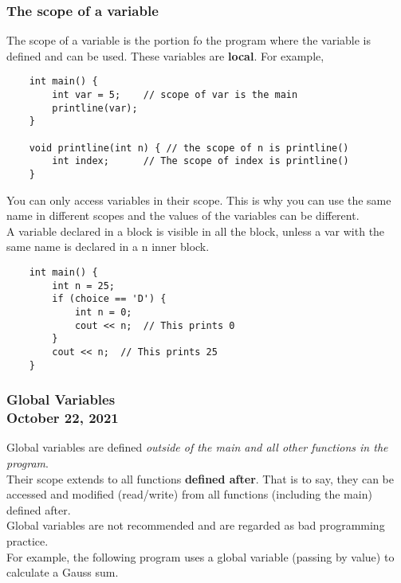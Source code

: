 \documentclass[]{article}
\begin{document}
\subsubsection{The scope of a variable}
\bigbreak


The scope of a variable is the portion fo the program where the variable is defined and can be used. These variables are \textbf{local}. For example, 

\begin{lstlisting}
	int main() {
		int var = 5;	// scope of var is the main	
		printline(var);
	}
	
	void printline(int n) {	// the scope of n is printline()
		int index;		// The scope of index is printline()	
	}
\end{lstlisting}\bigbreak

You can only access variables in their scope. This is why you can use the same name in different scopes and the values of the variables can be different.\\

A variable declared in a block {} is visible in all the block, unless a var with the same name is declared in a n inner block.\\

\begin{lstlisting}
	int main() {
		int n = 25;
		if (choice == 'D') {
			int n = 0;
			cout << n;	// This prints 0
		}
		cout << n;	// This prints 25
	}
\end{lstlisting}\bigbreak


\subsubsection{Global Variables\\ {\large \normalfont October 22, 2021}}
\bigbreak

Global variables are defined \textit{outside of the main and all other functions in the program}.\\

Their scope extends to all functions \textbf{defined after}. That is to say, they can be accessed and modified (read/write) from all functions (including the main) defined after.\\

Global variables are not recommended and are regarded as bad programming practice.\\

For example, the following program uses a global variable (passing by value) to calculate a Gauss sum.\\
\end{document}
